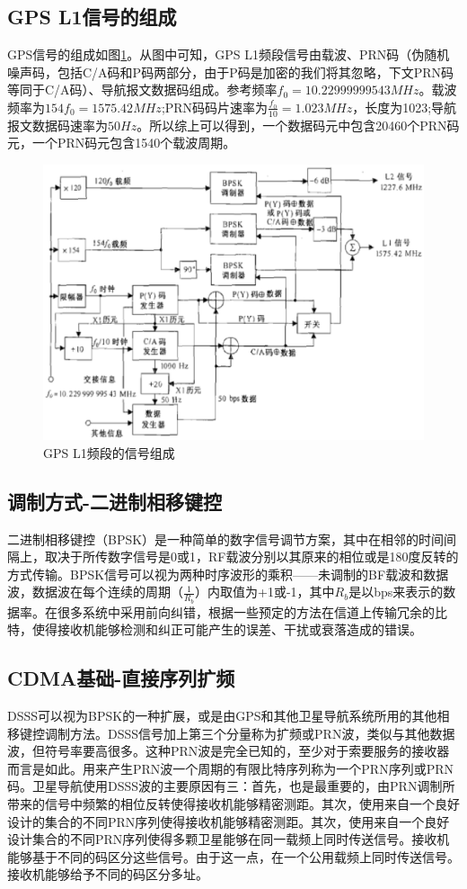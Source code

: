 \documentclass[UTF8,titlepage]{ctexart}
\begin{document}
\subsection*{GPS L1信号的组成}
GPS信号的组成如图\ref{fig:GPSL1}。从图中可知，GPS L1频段信号由载波、PRN码（伪随机噪声码，包括C/A码和P码两部分，由于P码是加密的我们将其忽略，下文PRN码等同于C/A码）、导航报文数据码组成。参考频率$f_0=10.22999999543MHz$。载波频率为$154f_0=1575.42MHz$;PRN码码片速率为$\frac{f_0}{10}=1.023MHz$，长度为1023;导航报文数据码速率为$50Hz$。所以综上可以得到，一个数据码元中包含20460个PRN码元，一个PRN码元包含1540个载波周期。
\begin{figure}[H]
\centering
\includegraphics[width = .9\textwidth]{GPSL1.eps}
\caption{GPS L1频段的信号组成}
\label{fig:GPSL1}
\end{figure}
\subsection*{调制方式-二进制相移键控}
二进制相移键控（BPSK）是一种简单的数字信号调节方案，其中在相邻的时间间隔上，取决于所传数字信号是0或1，RF载波分别以其原来的相位或是180度反转的方式传输。BPSK信号可以视为两种时序波形的乘积——未调制的BF载波和数据波，数据波在每个连续的周期（$\frac{1}{R_b}$）内取值为+1或-1，其中${R_b}$是以bps来表示的数据率。在很多系统中采用前向纠错，根据一些预定的方法在信道上传输冗余的比特，使得接收机能够检测和纠正可能产生的误差、干扰或衰落造成的错误。
\subsection*{CDMA基础-直接序列扩频}
DSSS可以视为BPSK的一种扩展，或是由GPS和其他卫星导航系统所用的其他相移键控调制方法。DSSS信号加上第三个分量称为扩频或PRN波，类似与其他数据波，但符号率要高很多。这种PRN波是完全已知的，至少对于索要服务的接收器而言是如此。用来产生PRN波一个周期的有限比特序列称为一个PRN序列或PRN码。卫星导航使用DSSS波的主要原因有三：首先，也是最重要的，由PRN调制所带来的信号中频繁的相位反转使得接收机能够精密测距。其次，使用来自一个良好设计的集合的不同PRN序列使得接收机能够精密测距。其次，使用来自一个良好设计集合的不同PRN序列使得多颗卫星能够在同一载频上同时传送信号。接收机能够基于不同的码区分这些信号。由于这一点，在一个公用载频上同时传送信号。接收机能够给予不同的码区分多址。
\end{document}
